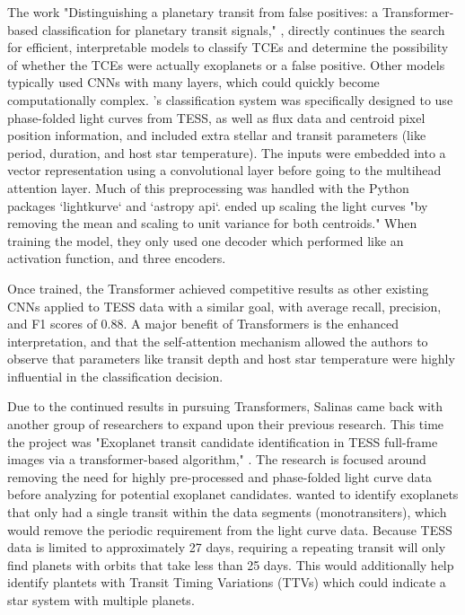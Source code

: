 \documentclass[letterpaper]{article} %
\begin{document}
The work "Distinguishing a planetary transit from false positives: a Transformer-based classification for planetary transit signals," \cite{salinas2023distinguishingtransitfalsepositives}, directly continues the search for efficient, interpretable models to classify TCEs and determine the possibility of whether the TCEs were actually exoplanets or a false positive. Other models typically used CNNs with many layers, which could quickly become computationally complex. \citeauthor{salinas2023distinguishingtransitfalsepositives}'s classification system was specifically designed to use phase-folded light curves from TESS, as well as flux data and centroid pixel position information, and included extra stellar and transit parameters (like period, duration, and host star temperature). The inputs were embedded into a vector representation using a convolutional layer before going to the multihead attention layer. Much of this preprocessing was handled with the Python packages `lightkurve` and `astropy api`. \citeauthor{salinas2023distinguishingtransitfalsepositives} ended up scaling the light curves "by removing the mean and scaling to unit variance for both centroids." When training the model, they only used one decoder which performed like an activation function, and three encoders.

Once trained, the Transformer achieved competitive results as other existing CNNs applied to TESS data with a similar goal, with average recall, precision, and F1 scores of 0.88. A major benefit of Transformers is the enhanced interpretation, and that the self-attention mechanism allowed the authors to observe that parameters like transit depth and host star temperature were highly influential in the classification decision.

Due to the continued results in pursuing Transformers, Salinas came back with another group of researchers to expand upon their previous research. This time the project was "Exoplanet transit candidate identification in TESS full-frame images via a transformer-based algorithm," \cite{salinas2025tessfullframe}. The research is focused around removing the need for highly pre-processed and phase-folded light curve data before analyzing for potential exoplanet candidates. \citeauthor{salinas2025tessfullframe} wanted to identify exoplanets that only had a single transit within the data segments (monotransiters), which would remove the periodic requirement from the light curve data. Because TESS data is limited to approximately 27 days, requiring a repeating transit will only find planets with orbits that take less than 25 days. This would additionally help identify plantets with Transit Timing Variations (TTVs) which could indicate a star system with multiple planets.
\end{document}
